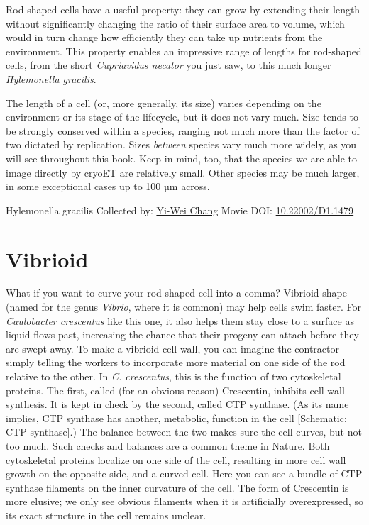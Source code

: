 \documentclass[]{tufte-book}
\begin{document}
Rod-shaped cells have a useful property: they can grow by extending their length without significantly changing the ratio of their surface area to volume, which would in turn change how efficiently they can take up nutrients from the environment. This property enables an impressive range of lengths for rod-shaped cells, from the short \emph{Cupriavidus necator} you just saw, to this much longer \emph{Hylemonella gracilis}.

The length of a cell (or, more generally, its size) varies depending on the environment or its stage of the lifecycle, but it does not vary much. Size tends to be strongly conserved within a species, ranging not much more than the factor of two dictated by replication. Sizes \emph{between} species vary much more widely, as you will see throughout this book. Keep in mind, too, that the species we are able to image directly by cryoET are relatively small. Other species may be much larger, in some exceptional cases up to 100 µm across.



\hypertarget{htmlwidget-c41247e9ebe66fe824f5}{}

\label{fig:3-3}Hylemonella gracilis Collected by: \protect\hyperlink{yi-wei_chang}{Yi-Wei Chang} Movie DOI: \href{https://doi.org/10.22002/D1.1479}{10.22002/D1.1479}

\hypertarget{vibrioid}{%
\section{Vibrioid}\label{vibrioid}}

What if you want to curve your rod-shaped cell into a comma? Vibrioid shape (named for the genus \emph{Vibrio}, where it is common) may help cells swim faster. For \emph{Caulobacter crescentus} like this one, it also helps them stay close to a surface as liquid flows past, increasing the chance that their progeny can attach before they are swept away. To make a vibrioid cell wall, you can imagine the contractor simply telling the workers to incorporate more material on one side of the rod relative to the other. In \emph{C. crescentus}, this is the function of two cytoskeletal proteins. The first, called (for an obvious reason) Crescentin, inhibits cell wall synthesis. It is kept in check by the second, called CTP synthase. (As its name implies, CTP synthase has another, metabolic, function in the cell {[}Schematic: CTP synthase{]}.) The balance between the two makes sure the cell curves, but not too much. Such checks and balances are a common theme in Nature. Both cytoskeletal proteins localize on one side of the cell, resulting in more cell wall growth on the opposite side, and a curved cell. Here you can see a bundle of CTP synthase filaments on the inner curvature of the cell. The form of Crescentin is more elusive; we only see obvious filaments when it is artificially overexpressed, so its exact structure in the cell remains unclear.
\end{document}
